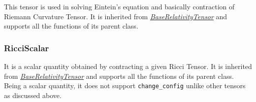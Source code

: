 \documentclass{aastex63}
\begin{document}
This tensor is used in solving Eintein's  equation and basically contraction of Riemann Curvature Tensor.  It is inherited from \hyperref[subsec:BaseRelativityTensor]{\textit{BaseRelativityTensor}} and supports all the functions of its parent class. 



\subsubsection{RicciScalar}\label{subsubsec:ricciscalar}

It is a scalar quantity obtained by contracting a given Ricci Tensor. It is inherited from \hyperref[subsec:BaseRelativityTensor]{\textit{BaseRelativityTensor}} and supports all the functions of its parent class. Being a scalar quantity, it does not support \texttt{change\_config} unlike other tensors as discussed above.

\end{document}
